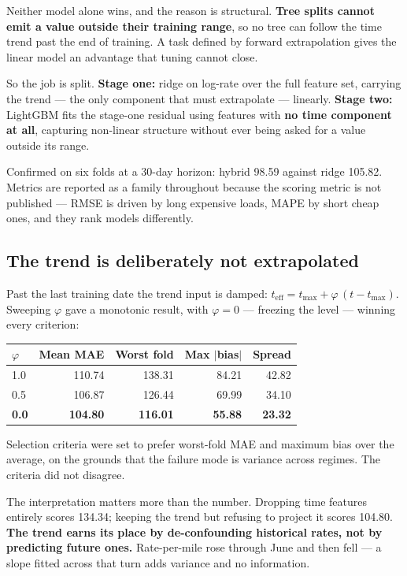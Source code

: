 \documentclass[11pt,a4paper]{article}
\newcommand{\key}[1]{\textbf{\color{spotter}#1}}
\begin{document}
Neither model alone wins, and the reason is structural. \key{Tree splits cannot
emit a value outside their training range}, so no tree can follow the time trend
past the end of training. A task defined by forward extrapolation gives the linear
model an advantage that tuning cannot close.

So the job is split. \textbf{Stage one:} ridge on log-rate over the full feature
set, carrying the trend --- the only component that must extrapolate --- linearly.
\textbf{Stage two:} LightGBM fits the stage-one residual using features with
\key{no time component at all}, capturing non-linear structure without ever being
asked for a value outside its range.

Confirmed on six folds at a 30-day horizon: hybrid 98.59 against ridge 105.82.
Metrics are reported as a family throughout because the scoring metric is not
published --- RMSE is driven by long expensive loads, MAPE by short cheap ones,
and they rank models differently.

\subsection{The trend is deliberately not extrapolated}

Past the last training date the trend input is damped:
$t_{\text{eff}} = t_{\max} + \varphi\,(t - t_{\max})$. Sweeping $\varphi$ gave a
monotonic result, with $\varphi = 0$ --- freezing the level --- winning every
criterion:

\begin{center}
\small
\begin{tabular}{@{}lrrrr@{}}
\toprule
$\varphi$ & \textbf{Mean MAE} & \textbf{Worst fold} & \textbf{Max $|$bias$|$} & \textbf{Spread}\\
\midrule
1.0 & 110.74 & 138.31 & 84.21 & 42.82\\
0.5 & 106.87 & 126.44 & 69.99 & 34.10\\
\key{0.0} & \key{104.80} & \key{116.01} & \key{55.88} & \key{23.32}\\
\bottomrule
\end{tabular}
\end{center}

Selection criteria were set to prefer worst-fold MAE and maximum bias over the
average, on the grounds that the failure mode is variance across regimes. The
criteria did not disagree.

The interpretation matters more than the number. Dropping time features entirely
scores 134.34; keeping the trend but refusing to project it scores 104.80.
\key{The trend earns its place by de-confounding historical rates, not by
predicting future ones.} Rate-per-mile rose through June and then fell --- a slope
fitted across that turn adds variance and no information.
\end{document}
